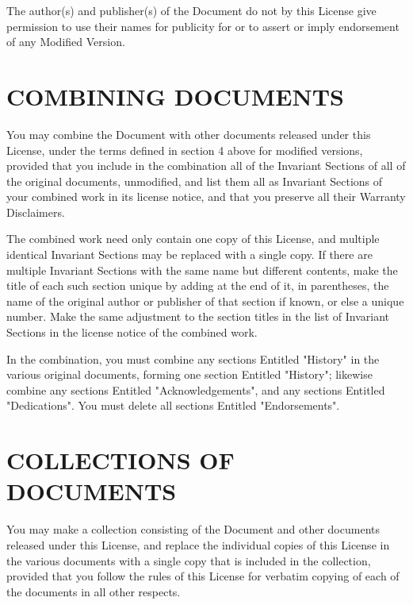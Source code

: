 \documentclass[oneside]{stacks-project-book}
\theoremstyle{plain}
\theoremstyle{definition}
\theoremstyle{remark}
\numberwithin{equation}{subsection}
\begin{document}
The author(s) and publisher(s) of the Document do not by this License
give permission to use their names for publicity for or to assert or
imply endorsement of any Modified Version.


\section{COMBINING DOCUMENTS}
\label{fdl-section-combining-documents}
\hypertarget{05BK}{}
\reversemarginpar{}


You may combine the Document with other documents released under this
License, under the terms defined in section 4 above for modified
versions, provided that you include in the combination all of the
Invariant Sections of all of the original documents, unmodified, and
list them all as Invariant Sections of your combined work in its
license notice, and that you preserve all their Warranty Disclaimers.

The combined work need only contain one copy of this License, and
multiple identical Invariant Sections may be replaced with a single
copy.  If there are multiple Invariant Sections with the same name but
different contents, make the title of each such section unique by
adding at the end of it, in parentheses, the name of the original
author or publisher of that section if known, or else a unique number.
Make the same adjustment to the section titles in the list of
Invariant Sections in the license notice of the combined work.

In the combination, you must combine any sections Entitled "History"
in the various original documents, forming one section Entitled
"History"; likewise combine any sections Entitled "Acknowledgements",
and any sections Entitled "Dedications".  You must delete all sections
Entitled "Endorsements".

\section{COLLECTIONS OF DOCUMENTS}
\label{fdl-section-collections-of-documents}
\hypertarget{05BL}{}
\reversemarginpar{}

You may make a collection consisting of the Document and other documents
released under this License, and replace the individual copies of this
License in the various documents with a single copy that is included in
the collection, provided that you follow the rules of this License for
verbatim copying of each of the documents in all other respects.
\end{document}
